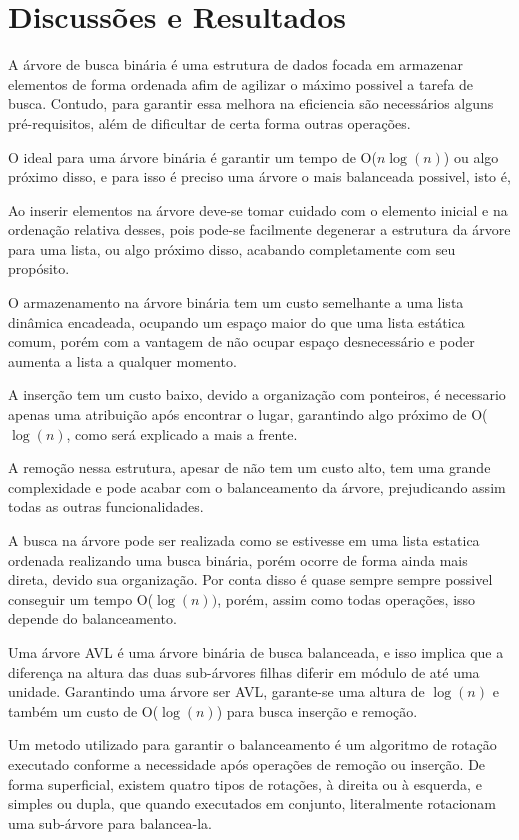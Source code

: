\chapter{Discussões e Resultados}
\label{chap:discussoes e resultados}

A árvore de busca binária é uma estrutura de dados focada em armazenar elementos de forma ordenada afim de agilizar o máximo possivel a tarefa de busca.
Contudo, para garantir essa melhora na eficiencia são necessários alguns pré-requisitos, além de dificultar de certa forma outras operações.

O ideal para uma árvore binária é garantir um tempo de O($n\log(n)$) ou algo próximo disso, e para isso é preciso uma árvore o mais balanceada possivel, isto é,

Ao inserir elementos na árvore deve-se tomar cuidado com o elemento inicial e na ordenação relativa desses, pois pode-se facilmente degenerar a estrutura da árvore para uma lista, ou algo próximo disso, acabando completamente com seu propósito.

O armazenamento na árvore binária tem um custo semelhante a uma lista dinâmica encadeada, ocupando um espaço maior do que uma lista estática comum, porém com a vantagem de não ocupar espaço desnecessário e poder aumenta a lista a qualquer momento.

A inserção tem um custo baixo, devido a organização com ponteiros, é necessario apenas uma atribuição após encontrar o lugar, garantindo algo próximo de O($\log(n)$, como será explicado a mais a frente.

A remoção nessa estrutura, apesar de não tem um custo alto, tem uma grande complexidade e pode acabar com o balanceamento da árvore, prejudicando assim todas as outras funcionalidades.

A busca na árvore pode ser realizada como se estivesse em uma lista estatica ordenada realizando uma busca binária, porém ocorre de forma ainda mais direta, devido sua organização. Por conta disso é quase sempre sempre possivel conseguir um tempo O($\log(n))$, porém, assim como todas operações, isso depende do balanceamento.

Uma árvore AVL é uma árvore binária de busca balanceada, e isso implica que a diferença na altura das duas sub-árvores filhas diferir em módulo de até uma unidade. Garantindo uma árvore ser AVL, garante-se uma altura de $\log(n)$ e também um custo de O($\log(n)$) para busca inserção e remoção.

Um metodo utilizado para garantir o balanceamento é um algoritmo de rotação executado conforme a necessidade após operações de remoção ou inserção. De forma superficial, existem quatro tipos de rotações, à direita ou à esquerda, e simples ou dupla, que quando executados em conjunto, literalmente rotacionam uma sub-árvore para balancea-la.
